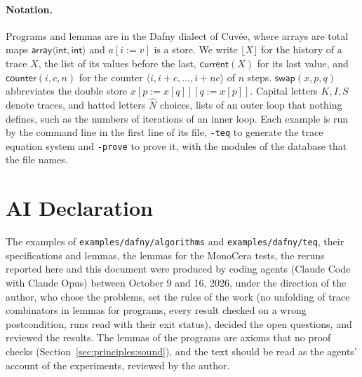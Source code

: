 \documentclass[11pt,a4paper]{article}
\newcommand{\bl}[1]{\lfloor #1\rfloor}                       %
\newcommand{\cnt}{\mathsf{counter}}
\newcommand{\cur}{\mathsf{current}}
\newcommand{\swap}[3]{\mathsf{swap}(#1, #2, #3)}
\newcommand{\seq}[1]{\hat{#1}}                               %
\begin{document}
\paragraph{Notation.} Programs and lemmas are in the Dafny dialect of Cuvée, where arrays are total maps
$\mathsf{array}\langle\mathsf{int},\mathsf{int}\rangle$ and $a[i := v]$ is a store. We write $\bl{X}$ for the history of a
trace $X$, the list of its values before the last, $\cur(X)$ for its last value, and $\cnt(i, c, n)$ for the counter
$\langle i, i + c, \ldots, i + nc\rangle$ of $n$ steps. $\swap{x}{p}{q}$ abbreviates the double store
$x[p := x[q]][q := x[p]]$. Capital letters $K, I, S$ denote traces, and hatted letters $\seq{N}$ choices, lists of an outer
loop that nothing defines, such as the numbers of iterations of an inner loop. Each example is run by the command line
in the first line of its file, \texttt{-teq} to generate the trace equation system and \texttt{-prove} to prove it, with
the modules of the database that the file names.
















\section*{AI Declaration}

The examples of \texttt{examples/dafny/algorithms} and \texttt{examples/dafny/teq}, their specifications and lemmas,
the lemmas for the MonoCera tests, the reruns reported here and this document were produced by coding agents (Claude
Code with Claude Opus) between October 9 and 16, 2026, under the direction of the author, who chose the problems, set the
rules of the work (no unfolding of trace combinators in lemmas for programs, every result checked on a wrong
postcondition, runs read with their exit status), decided the open questions, and reviewed the results. The lemmas of
the programs are axioms that no proof checks (Section~\ref{sec:principles:sound}), and the text should be read as the
agents' account of the experiments, reviewed by the author.
\end{document}
